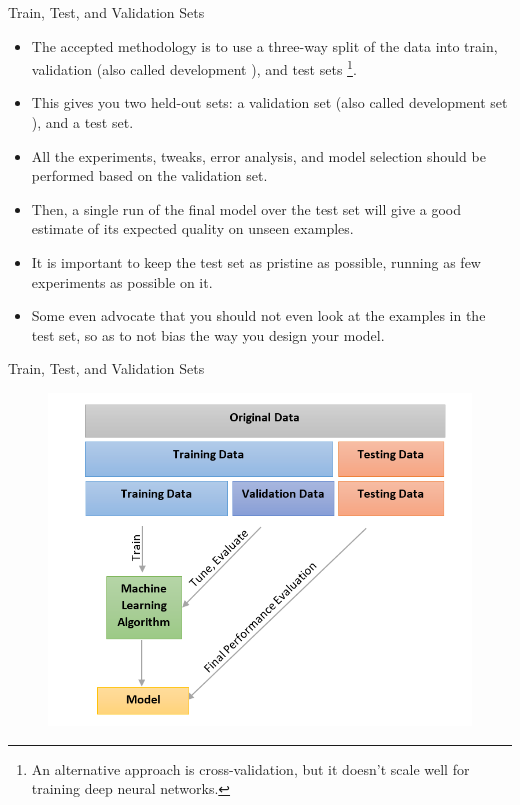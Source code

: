 \documentclass[handout]{beamer}
\begin{document}
\begin{frame}{Train, Test, and Validation Sets}
\begin{scriptsize}
\begin{itemize}
\item The accepted methodology is to use a three-way split of the data into train, validation (also called development ), and test sets \footnote{An alternative approach is cross-validation, but it doesn't scale well for training deep neural networks.}. 
\item This gives you two held-out sets: a validation set (also called development set ), and a test set.
\item All the experiments, tweaks, error analysis, and model selection should be performed based on the validation set. 
\item Then, a single run of the final model over the test set will give a good estimate of its expected quality on unseen examples. 
\item It is important to keep the test set as pristine as possible, running as few experiments as possible on it. 
\item Some even advocate that you should not even look at the examples in the test
set, so as to not bias the way you design your model.



\end{itemize}

\end{scriptsize}
\end{frame}



\begin{frame}{Train, Test, and Validation Sets}
\begin{scriptsize}

 \begin{figure}[htb]
	\centering
	 \includegraphics[scale=0.55]{pics/validation.png}
\end{figure}


\end{scriptsize}
\end{frame}
\end{document}
